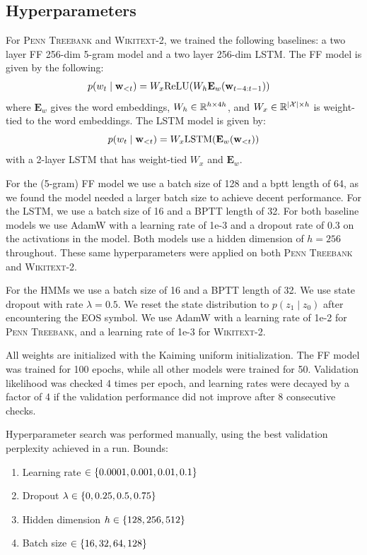 \documentclass[11pt,a4paper]{article}
\begin{document}
\subsection{Hyperparameters}
\label{sec:hyperparams}

For \textsc{Penn Treebank} and \textsc{Wikitext-2}, we trained the following baselines:
a two layer FF 256-dim 5-gram model and a two layer 256-dim LSTM.
The FF model is given by the following:
\begin{equation}
\begin{aligned}
p(w_t \mid \mathbf{w}_{<t})
&= W_x\textrm{ReLU}(W_h\mathbf{E}_w(\mathbf{w}_{t-4:t-1}))
\end{aligned}
\end{equation}
where $\mathbf{E}_w$ gives the word embeddings,
$W_h\in\mathbb{R}^{h\times 4h}$, and
$W_x\in\mathbb{R}^{|\mathcal{X}|\times h}$ is weight-tied to the word embeddings.
The LSTM model is given by:
\begin{equation}
p(w_t \mid \mathbf{w}_{<t})
= W_x \textrm{LSTM}(\mathbf{E}_w(\mathbf{w}_{<t}))
\end{equation}
with a 2-layer LSTM
that has weight-tied $W_x$ and $\mathbf{E}_w$.

For the (5-gram) FF model we use a batch size of 128 and a bptt length of 64,
as we found the model needed a larger batch size to achieve decent performance.
For the LSTM, we use a batch size of 16 and a BPTT length of 32.
For both baseline models we use AdamW \citep{adamw} with a learning rate of 1e-3 and a dropout rate of 0.3 on the activations in the model.
Both models use a hidden dimension of $h=256$ throughout.
These same hyperparameters were applied on both \textsc{Penn Treebank} and \textsc{Wikitext-2}.

For the HMMs we use a batch size of 16 and a BPTT length of 32.
We use state dropout with rate $\lambda = 0.5$.
We reset the state distribution to $p(z_1 \mid z_0)$ after encountering the EOS symbol.
We use AdamW \citep{adamw} with a learning rate of 1e-2 for \textsc{Penn Treebank},
and a learning rate of 1e-3 for \textsc{Wikitext-2}.

All weights are initialized with the Kaiming uniform initialization.
The FF model was trained for 100 epochs, while all other models were trained for 50.
Validation likelihood was checked 4 times per epoch, and
learning rates were decayed by a factor of 4 if the validation performance
did not improve after 8 consecutive checks.

Hyperparameter search was performed manually, using the best
validation perplexity achieved in a run.
Bounds:
\begin{enumerate}
\item Learning rate $\in \left\{0.0001, 0.001, 0.01, 0.1\right\}$
\item Dropout $\lambda \in \left\{0, 0.25, 0.5, 0.75\right\}$
\item Hidden dimension $h \in \left\{128,256,512\right\}$
\item Batch size $\in \left\{16, 32, 64, 128\right\}$
\end{enumerate}
\end{document}

